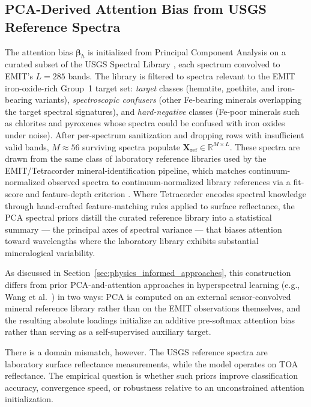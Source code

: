 \documentclass[11pt]{report}
\newcommand{\R}{\mathbb{R}}
\begin{document}
\subsection{PCA-Derived Attention Bias from USGS Reference Spectra}
\label{sec:pca_priors}

The attention bias $\bm{\beta}_h$ is initialized from Principal Component Analysis on a curated subset of the USGS Spectral Library \cite{kokaly2017usgs}, each spectrum convolved to EMIT's $L = 285$ bands. The library is filtered to spectra relevant to the EMIT iron-oxide-rich Group~1 target set: \emph{target} classes (hematite, goethite, and iron-bearing variants), \emph{spectroscopic confusers} (other Fe-bearing minerals overlapping the target spectral signatures), and \emph{hard-negative} classes (Fe-poor minerals such as chlorites and pyroxenes whose spectra could be confused with iron oxides under noise). After per-spectrum sanitization and dropping rows with insufficient valid bands, $M \approx 56$ surviving spectra populate $\mathbf{X}_{\text{ref}} \in \R^{M \times L}$. These spectra are drawn from the same class of laboratory reference libraries used by the EMIT/Tetracorder mineral-identification pipeline, which matches continuum-normalized observed spectra to continuum-normalized library references via a fit-score and feature-depth criterion \cite{clark2003tetracorder, clark2024tetracorder, emit_l2b_atbd}. Where Tetracorder encodes spectral knowledge through hand-crafted feature-matching rules applied to surface reflectance, the PCA spectral priors distill the curated reference library into a statistical summary --- the principal axes of spectral variance --- that biases attention toward wavelengths where the laboratory library exhibits substantial mineralogical variability.

As discussed in Section~\ref{sec:physics_informed_approaches}, this construction differs from prior PCA-and-attention approaches in hyperspectral learning (e.g., Wang et al.~\cite{wang2021attention_pca_guided}) in two ways: PCA is computed on an external sensor-convolved mineral reference library rather than on the EMIT observations themselves, and the resulting absolute loadings initialize an additive pre-softmax attention bias rather than serving as a self-supervised auxiliary target.

There is a domain mismatch, however. The USGS reference spectra are laboratory surface reflectance measurements, while the model operates on TOA reflectance. The empirical question is whether such priors improve classification accuracy, convergence speed, or robustness relative to an unconstrained attention initialization.
\end{document}
